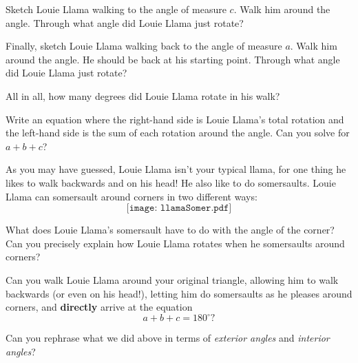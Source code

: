 \documentclass[handout,nooutcomes,noauthor]{ximera}
\begin{document}
\begin{problem}
Sketch Louie Llama walking to the angle of measure $c$. Walk him
around the angle. Through what angle did Louie Llama just rotate?
\end{problem}

\begin{problem}
Finally, sketch Louie Llama walking back to the angle of measure
$a$. Walk him around the angle. He should be back at his starting
point. Through what angle did Louie Llama just rotate?
\end{problem}

\begin{problem} 
All in all, how many degrees did Louie Llama rotate in his walk?
\end{problem}

\begin{problem} 
Write an equation where the right-hand side is Louie Llama's total
rotation and the left-hand side is the sum of each rotation around the
angle. Can you solve for $a+b+c$?
\end{problem}

As you may have guessed, Louie Llama isn't your typical llama, for one
thing he likes to walk backwards and on his head! He also like to do
somersaults. Louie Llama can somersault around corners in two
different ways:
\[
\texttt{[image: llamaSomer.pdf]}
\]

\begin{problem} 
What does Louie Llama's somersault have to do with the angle of the
corner? Can you precisely explain how Louie Llama rotates when he
somersaults around corners?
\end{problem}


\begin{problem}
Can you walk Louie Llama around your original triangle, allowing him to
walk backwards (or even on his head!), letting him do somersaults as
he pleases around corners, and \textbf{directly} arrive at the
equation
\[
a + b + c = 180^\circ?
\]
\end{problem}

\begin{problem} 
Can you rephrase what we did above in terms of \textit{exterior angles} and \textit{interior angles}?
\end{problem}
\end{document}

